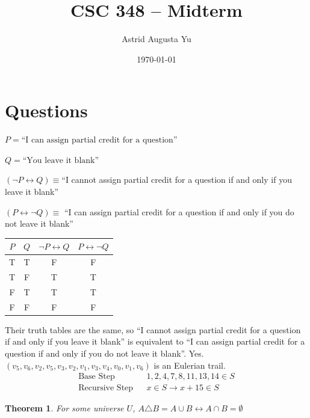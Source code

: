 \documentclass{article}
\author{Astrid Augusta Yu}
\title{CSC 348 -- Midterm}
\date{\today}
\newtheorem{theorem}{Theorem}
\begin{document}
\maketitle
\tableofcontents

\section{Questions}
\begin{outline}[enumerate]
    \1 $P = \text{``I can assign partial credit for a question''}$

        $Q = \text{``You leave it blank''}$

        $(\neg P \leftrightarrow Q) \equiv$``I cannot assign partial credit for a question if and only if you leave it blank''

        $(P \leftrightarrow \neg Q) \equiv$ ``I can assign partial credit for a question if and only if you do not leave it blank''

        \begin{table}[ht]
            \centering
            \begin{tabular}{c | c | c | c}
                $P$ & $Q$ & $\neg P \leftrightarrow Q$ & $P \leftrightarrow \neg Q$ \\
                \hline 
                T & T & F & F \\ 
                T & F & T & T \\
                F & T & T & T \\
                F & F & F & F 
            \end{tabular}
        \end{table}

        Their truth tables are the same, so ``I cannot assign partial credit for a question if and only if you leave it blank'' is equivalent to ``I can assign partial credit for a question if and only if you do not leave it blank''.
    \1 Yes. $(v_5, v_6, v_2, v_5, v_3, v_2, v_1, v_3, v_4, v_0, v_1, v_6)$ is an Eulerian trail.
    \1 \begin{equation}
        \begin{aligned}
            \text{Base Step} && 1, 2, 4, 7, 8, 11, 13, 14 \in S \\
            \text{Recursive Step} && x \in S \rightarrow x + 15 \in S
        \end{aligned}
    \end{equation}
    \1 \begin{theorem}
        For some universe $U$, $A \triangle B = A \cup B \leftrightarrow A \cap B = \emptyset$
        \label{thm:adelb}
    \end{theorem}


\end{outline}
\end{document}
